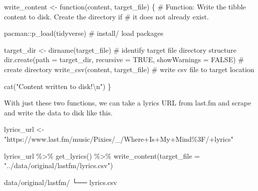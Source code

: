 \documentclass[
  letterpaper,
]{latex/krantz}
\newenvironment{Shaded}{\begin{snugshade}}{\end{snugshade}}
\newcommand{\AttributeTok}[1]{\textcolor[rgb]{0.40,0.45,0.13}{#1}}
\newcommand{\CommentTok}[1]{\textcolor[rgb]{0.37,0.37,0.37}{#1}}
\newcommand{\ConstantTok}[1]{\textcolor[rgb]{0.56,0.35,0.01}{#1}}
\newcommand{\ControlFlowTok}[1]{\textcolor[rgb]{0.00,0.23,0.31}{#1}}
\newcommand{\ExtensionTok}[1]{\textcolor[rgb]{0.00,0.23,0.31}{#1}}
\newcommand{\FunctionTok}[1]{\textcolor[rgb]{0.28,0.35,0.67}{#1}}
\newcommand{\NormalTok}[1]{\textcolor[rgb]{0.00,0.23,0.31}{#1}}
\newcommand{\OtherTok}[1]{\textcolor[rgb]{0.00,0.23,0.31}{#1}}
\newcommand{\SpecialCharTok}[1]{\textcolor[rgb]{0.37,0.37,0.37}{#1}}
\newcommand{\StringTok}[1]{\textcolor[rgb]{0.13,0.47,0.30}{#1}}
\begin{document}
\begin{Shaded}
\begin{Highlighting}[]
\NormalTok{write\_content }\OtherTok{\textless{}{-}} \ControlFlowTok{function}\NormalTok{(content, target\_file) \{}
  \CommentTok{\# Function: Write the tibble content to disk. Create the directory if}
  \CommentTok{\# it does not already exist.}
  
\NormalTok{  pacman}\SpecialCharTok{::}\FunctionTok{p\_load}\NormalTok{(tidyverse) }\CommentTok{\# install/ load packages}
  
\NormalTok{  target\_dir }\OtherTok{\textless{}{-}} \FunctionTok{dirname}\NormalTok{(target\_file) }\CommentTok{\# identify target file directory structure}
  \FunctionTok{dir.create}\NormalTok{(}\AttributeTok{path =}\NormalTok{ target\_dir, }\AttributeTok{recursive =} \ConstantTok{TRUE}\NormalTok{, }\AttributeTok{showWarnings =} \ConstantTok{FALSE}\NormalTok{) }\CommentTok{\# create directory}
  \FunctionTok{write\_csv}\NormalTok{(content, target\_file) }\CommentTok{\# write csv file to target location}
  
  \FunctionTok{cat}\NormalTok{(}\StringTok{"Content written to disk!}\SpecialCharTok{\textbackslash{}n}\StringTok{"}\NormalTok{)}
\NormalTok{\}}
\end{Highlighting}
\end{Shaded}

With just these two functions, we can take a lyrics URL from last.fm and
scrape and write the data to disk like this.

\begin{Shaded}
\begin{Highlighting}[]
\NormalTok{lyrics\_url }\OtherTok{\textless{}{-}} \StringTok{"https://www.last.fm/music/Pixies/\_/Where+Is+My+Mind\%3F/+lyrics"}

\NormalTok{lyrics\_url }\SpecialCharTok{\%\textgreater{}\%} 
  \FunctionTok{get\_lyrics}\NormalTok{() }\SpecialCharTok{\%\textgreater{}\%} 
  \FunctionTok{write\_content}\NormalTok{(}\AttributeTok{target\_file =} \StringTok{"../data/original/lastfm/lyrics.csv"}\NormalTok{)}
\end{Highlighting}
\end{Shaded}

\begin{Shaded}
\begin{Highlighting}[]
\ExtensionTok{data/original/lastfm/}
\ExtensionTok{└──}\NormalTok{ lyrics.csv}
\end{Highlighting}
\end{Shaded}
\end{document}
